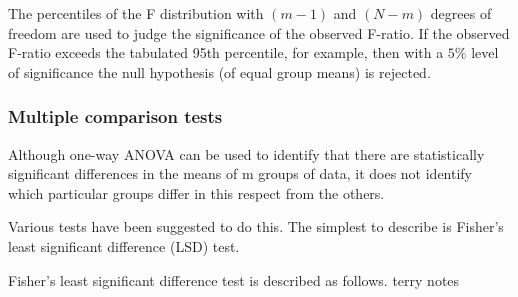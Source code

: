 \documentclass[12pt]{article}
\begin{document}
The percentiles of the F distribution with $(m - 1)$ and $(N - m)$ degrees of freedom are used to judge the significance of the observed F-ratio. If the observed F-ratio exceeds the tabulated 95th percentile, for example, then with a $5\%$ level of significance the null hypothesis (of equal group means) is rejected.

\subsubsection{Multiple comparison tests}
Although one-way ANOVA can be used to identify that there are statistically significant differences in the means of m groups of data, it does not identify which particular groups differ in this respect from the others.

Various tests have been suggested to do this. The simplest to describe is Fisher's least significant difference (LSD) test.

\begin{mdframed}
Fisher's least significant difference test is described as follows.
\textcolor[rgb]{1.00,1.00,1.00}{terry notes\lipsum[1-7]}
\end{mdframed}
\end{document}
